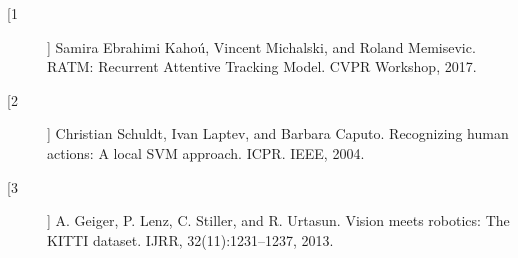 
\vspace{.5\baselineskip}

{\large
\begin{description}
    \item[[1]] Samira Ebrahimi Kahoú, Vincent Michalski, and Roland Memisevic. RATM: Recurrent Attentive Tracking Model. CVPR Workshop, 2017.
    \item[[2]] Christian Schuldt, Ivan Laptev, and Barbara Caputo. Recognizing human actions: A local SVM approach. ICPR. IEEE, 2004.
    \item[[3]] A. Geiger, P. Lenz, C. Stiller, and R. Urtasun. Vision meets robotics: The KITTI dataset. IJRR,
    32(11):1231–1237, 2013.
\end{description}
}